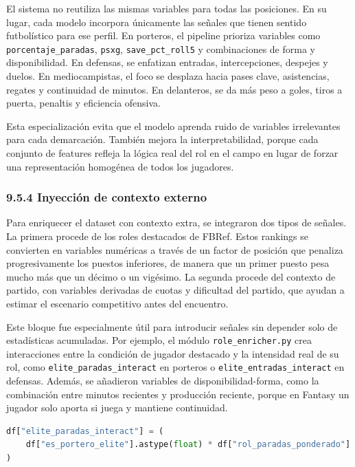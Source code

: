 El sistema no reutiliza las mismas variables para todas las posiciones. En su lugar, cada modelo incorpora únicamente las señales que tienen sentido
futbolístico para ese perfil. En porteros, el pipeline prioriza variables como \texttt{porcentaje\_paradas}, \texttt{psxg}, \texttt{save\_pct\_roll5}
y combinaciones de forma y disponibilidad. En defensas, se enfatizan entradas, intercepciones, despejes y duelos. En mediocampistas, el foco se desplaza
hacia pases clave, asistencias, regates y continuidad de minutos. En delanteros, se da más peso a goles, tiros a puerta, penaltis y eficiencia ofensiva.
 
Esta especialización evita que el modelo aprenda ruido de variables irrelevantes para cada demarcación. También mejora la interpretabilidad,
porque cada conjunto de features refleja la lógica real del rol en el campo en lugar de forzar una representación homogénea de todos los jugadores.
 
\subsubsection{9.5.4 Inyección de contexto externo}
 
Para enriquecer el dataset con contexto extra, se integraron dos tipos de señales. La primera procede de los roles destacados de FBRef. Estos rankings
se convierten en variables numéricas a través de un factor de posición que penaliza progresivamente los puestos inferiores, de manera que un primer puesto
pesa mucho más que un décimo o un vigésimo. La segunda procede del contexto de partido, con variables derivadas de cuotas y dificultad del partido, que ayudan
a estimar el escenario competitivo antes del encuentro.
 
Este bloque fue especialmente útil para introducir señales sin depender solo de estadísticas acumuladas. Por ejemplo,
el módulo \texttt{role\_enricher.py} crea interacciones entre la condición de jugador destacado y la intensidad real de su rol, como \texttt{elite\_paradas\_interact} en
porteros o \texttt{elite\_entradas\_interact} en defensas. Además, se añadieron variables de disponibilidad-forma, como la combinación entre minutos recientes y
producción reciente, porque en Fantasy un jugador solo aporta si juega y mantiene continuidad.
 
\begin{lstlisting}[language=Python,caption={Inyección de interacciones entre elite y rol para enriquecer representación de características}]
df["elite_paradas_interact"] = (
    df["es_portero_elite"].astype(float) * df["rol_paradas_ponderado"]
)
\end{lstlisting}
 
